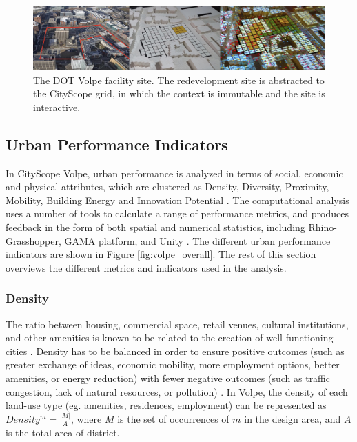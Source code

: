 {    \begin{figure}[!htb]
        \begin{center}
            \includegraphics[width=1\linewidth]{chapters/transformation/volpe/figures/volpe3.jpg}
        \end{center}
        \caption{The DOT Volpe facility site. The redevelopment site is abstracted to the CityScope grid, in which the context is immutable and the site is interactive.}
        \label{fig:volpe_site}
    \end{figure}

    \subsection{Urban Performance Indicators}

    {
        In CityScope Volpe, urban performance is analyzed in terms of social, economic and physical attributes, which are clustered as Density, Diversity, Proximity, Mobility, Building Energy and Innovation Potential \cite{katz2014rise}. The computational analysis uses a number of tools to calculate a range of performance metrics, and produces feedback in the form of both spatial and numerical statistics, including Rhino-Grasshopper, GAMA platform, and Unity \cite{TheHisto40:online, grignard2013gama, UnityRea35:online, noyman2018CityScopeARUD}. The different urban performance indicators are shown in Figure \eqref{fig:volpe_overall}. The rest of this section overviews the different metrics and indicators used in the analysis.

        \subsubsection{Density}
        {
            The ratio between housing, commercial space, retail venues, cultural institutions, and other amenities is known to be related to the creation of well functioning cities \cite{lynch1984good, gehl2013study, katz2014rise}. Density has to be balanced in order to ensure positive outcomes (such as greater exchange of ideas, economic mobility, more employment options, better amenities, or energy reduction) with fewer negative outcomes (such as traffic congestion, lack of natural resources, or pollution) \cite{hawley1972population, UnitedNationsHabitatIII2017, deloitte_2021}. In Volpe, the density of each land-use type (eg. amenities, residences, employment) can be represented as $Density^m=\frac{|M|}{A}$, where $M$ is the set of occurrences of $m$ in the design area, and $A$ is the total area of district.
        }


}}

